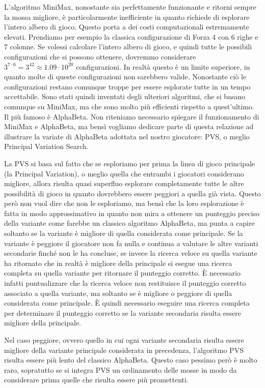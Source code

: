 \documentclass[a4paper]{article}
\begin{document}
L'algoritmo MiniMax, nonostante sia perfettamente funzionante e ritorni sempre
la mossa migliore, è particolarmente inefficiente in quanto richiede di 
esplorare l'intero albero di gioco. Questo porta a dei costi computazionali 
estremamente elevati. Prendiamo per esempio la classica configurazione di Forza 
4 con 6 righe e 7 colonne. Se volessi calcolare l'intero albero di gioco, e 
quindi tutte le possibili configurazioni che si possono ottenere, dovremmo 
considerare $3^{7 \cdot 6} = 3^{42} \approx 1.09 \cdot 10^{20}$ configurazioni. 
In realtà questo è un limite superiore, in quanto molte di queste configurazioni 
non sarebbero valide. Nonostante ciò le configurazioni restano comunque troppe 
per essere esplorate tutte in un tempo accettabile. Sono stati quindi inventati 
degli ulteriori algoritmi, che si basano comunque su MiniMax, ma che sono molto 
più efficienti rispetto a quest'ultimo. Il più famoso è AlphaBeta. Non 
riteniamo necessario spiegare il funzionamento di MiniMax e AlphaBeta, ma bensì 
vogliamo dedicare parte di questa relazione ad illustrare la variate di 
AlphaBeta adottata nel nostro giocatore: PVS, o meglio Principal Variation 
Search.

La PVS si basa sul fatto che se esploriamo per prima la linea di gioco 
principale (la Principal Variation), o meglio quella che entrambi i giocatori 
considerano migliore, allora risulta quasi superfluo esplorare completamente 
tutte le altre possibilità di gioco in quanto dovrebbero essere peggiori a 
quella già vista. Questo però non vuol dire che non le esploriamo, ma bensì che 
la loro esplorazione è fatta in modo approssimativo in quanto non mira a 
ottenere un punteggio preciso della variante come farebbe un classico algoritmo 
AlphaBeta, ma punta a capire soltanto se la variante è migliore di quella 
considerata come principale. Se la variante è peggiore il giocatore non fa nulla 
e continua a valutare le altre varianti secondarie finché non le ha concluse, se 
invece la ricerca veloce su quella variante ha ritornato che in realtà è 
migliore della principale si esegue una ricerca completa su quella variante per 
ritornare il punteggio corretto. È necessario infatti puntualizzare che la 
ricerca veloce non restituisce il punteggio corretto associato a quella 
variante, ma soltanto se è migliore o peggiore di quella considerata come 
principale. È quindi necessario eseguire una ricerca completa per determinare il
punteggio corretto se la variante secondaria risulta essere migliore della 
principale.

Nel caso peggiore, ovvero quello in cui ogni variante secondaria risulta essere
migliore della variante principale considerata in precedenza, l'algoritmo PVS 
risulta essere più lento del classico AlphaBeta. Questo caso pessimo però è 
molto raro, sopratutto se si integra PVS un ordinamento delle mosse in modo
da considerare prima quelle che risulta essere più promettenti.
\end{document}
